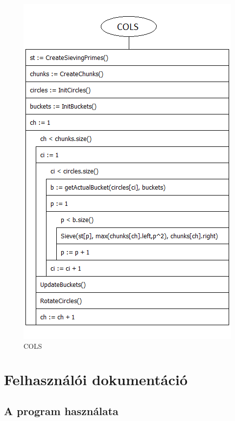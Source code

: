 \documentclass[twoside, a4paper, 12pt]{article}
\begin{document}
\begin{figure}[h]
\centering
\includegraphics{img/cols_stuki.png}
\caption{COLS}
\end{figure}

\clearpage
\section{Felhasználói dokumentáció}

\subsection{A program használata} \label{usage}
\end{document}

